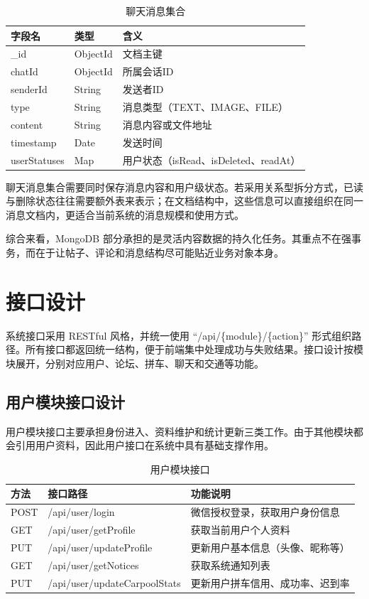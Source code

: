 \begin{table}[!htbp]
  \caption{聊天消息集合}
  \label{tab:message-collection}
  \centering
  \small
  \begin{tabular}{p{3.0cm}p{2.3cm}p{7.0cm}}
    \toprule
    字段名 & 类型 & 含义 \\
    \midrule
    \_id & ObjectId & 文档主键 \\
    chatId & ObjectId & 所属会话ID \\
    senderId & String & 发送者ID \\
    type & String & 消息类型（TEXT、IMAGE、FILE） \\
    content & String & 消息内容或文件地址 \\
    timestamp & Date & 发送时间 \\
    userStatuses & Map & 用户状态（isRead、isDeleted、readAt） \\
    \bottomrule
  \end{tabular}
\end{table}

聊天消息集合需要同时保存消息内容和用户级状态。若采用关系型拆分方式，已读与删除状态往往需要额外表来表示；在文档结构中，这些信息可以直接组织在同一消息文档内，更适合当前系统的消息规模和使用方式。

综合来看，MongoDB 部分承担的是灵活内容数据的持久化任务。其重点不在强事务，而在于让帖子、评论和消息结构尽可能贴近业务对象本身。

\section{接口设计}

系统接口采用 RESTful 风格，并统一使用 ``/api/\{module\}/\{action\}'' 形式组织路径。所有接口都返回统一结构，便于前端集中处理成功与失败结果。接口设计按模块展开，分别对应用户、论坛、拼车、聊天和交通等功能。

\subsection{用户模块接口设计}

用户模块接口主要承担身份进入、资料维护和统计更新三类工作。由于其他模块都会引用用户资料，因此用户接口在系统中具有基础支撑作用。

\begin{table}[!htbp]
  \caption{用户模块接口}
  \label{tab:user-api}
  \centering
  \small
  \begin{tabular}{p{1.6cm}p{4.6cm}p{6.2cm}}
    \toprule
    方法 & 接口路径 & 功能说明 \\
    \midrule
    POST & /api/user/login & 微信授权登录，获取用户身份信息 \\
    GET & /api/user/getProfile & 获取当前用户个人资料 \\
    PUT & /api/user/updateProfile & 更新用户基本信息（头像、昵称等） \\
    GET & /api/user/getNotices & 获取系统通知列表 \\
    PUT & /api/user/updateCarpoolStats & 更新用户拼车信用、成功率、迟到率 \\
    \bottomrule
  \end{tabular}
\end{table}

